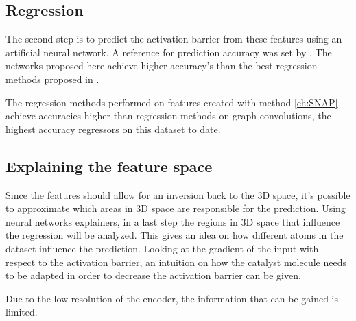 \subsection{Regression}

The second step is to predict the activation barrier from these features using an artificial neural network.
A reference for prediction accuracy was set by \cite{friederich_dos}.
The networks proposed here achieve higher accuracy's than the best regression methods proposed in \cite{friederich_dos}.

The regression methods performed on features created with method \ref{ch:SNAP} achieve accuracies higher than regression methods on graph convolutions,
the highest accuracy regressors on this dataset to date.

\subsection{Explaining the feature space}
Since the features should allow for an inversion back to the 3D space, it's possible to approximate which areas in 3D space are responsible for the prediction.
Using neural networks explainers, in  a last step the regions in 3D space that influence the regression will be analyzed.
This gives an idea on how different atoms in the dataset influence the prediction.
Looking at the gradient of the input with respect to the activation barrier, an intuition on how the catalyst molecule needs to be 
adapted in order to decrease the activation barrier can be given.

Due to the low resolution of the encoder, the information that can be gained is limited.